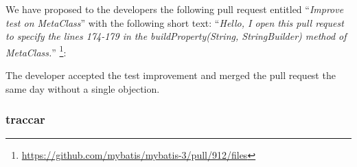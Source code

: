 \documentclass[table,xcdraw,smallextended]{svjour3}
\begin{document}
We have proposed to the developers the following pull request entitled ``\emph{Improve test on MetaClass}'' with the following short text: ``\emph{Hello, I open this pull request to specify the lines 174-179 in the buildProperty(String, StringBuilder) method of MetaClass.}'' \footnote{\url{https://github.com/mybatis/mybatis-3/pull/912/files}}:
\begin{figure}[H]
    \centering{}
\end{figure}

The developer accepted the test improvement and merged the pull request the same day without a single objection. 


\subsubsection{traccar}
\end{document}
